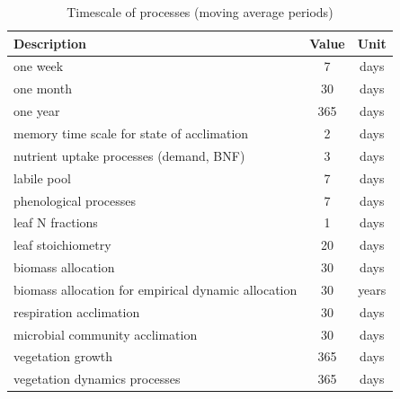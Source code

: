 \documentclass[11pt,oneside,openright,a4paper,fleqn]{book}  %
\begin{document}
\begin{table}
\caption{Timescale of processes (moving average periods)}
\begin{tabularx}{\linewidth}{|X|c|c|}
\hline 
Description & Value & Unit \\ 
\hline
one week & 7 & days \\
one month & 30 & days \\
one year & 365 & days \\
memory time scale for state of acclimation & 2 & days \\
nutrient uptake processes (demand, BNF)  & 3 & days \\
labile pool  & 7 & days \\
phenological processes  & 7 & days \\
leaf N fractions & 1 & days \\
leaf stoichiometry  & 20 & days \\
biomass allocation & 30 & days \\
biomass allocation for empirical dynamic allocation & 30 & years \\
respiration acclimation & 30 & days \\
microbial community acclimation & 30 & days \\
vegetation growth & 365 & days \\
vegetation dynamics processes  & 365 & days \\
\hline 
\end{tabularx}
\end{table}







 
 
\end{document}
